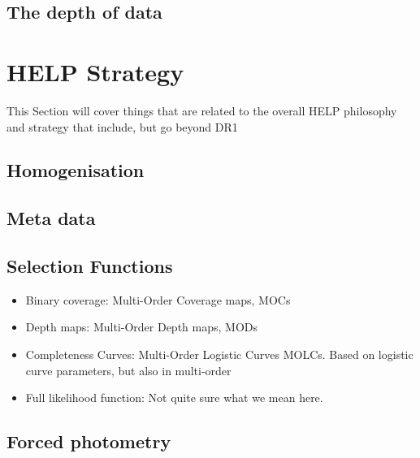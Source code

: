 \documentclass[usenatbib]{mnras}
\begin{document}
\subsection[The depth of data\\
{\color{red} (no longer needed as this is now a separate paper, but Intro might refer to this paper and subsequent DR1 results sections might relate to this). A section to look at CIRB vs mag and the co-variances of the
multi-wavelength data }]{The depth of data}

\section[HELP Strategy \\
{\color{red} This Section will cover things that are related to the overall HELP philosophy and strategy that include, but go beyond DR1}]{HELP Strategy}
{\color{red} This Section will cover things that are related to the overall HELP philosophy and strategy that include, but go beyond DR1}

\subsection{Homogenisation}
\subsection{Meta data}
\subsection{Selection Functions}
\begin{itemize}
  \item{Binary coverage:} Multi-Order Coverage maps, MOCs
  \item{Depth maps:} Multi-Order Depth maps, MODs
  \item{Completeness Curves:} Multi-Order Logistic Curves MOLCs. Based on
    logistic curve parameters, but also in multi-order
  \item{Full likelihood function:} Not quite sure what we mean here.
\end{itemize}


\subsection[Forced photometry\\ {\color{red} not done in DR1 so some discussion}]{Forced photometry}
\end{document}
